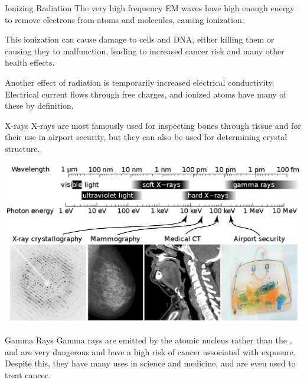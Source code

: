 \documentclass{beamer}
\begin{document}
\begin{frame}{Ionizing Radiation}
    The very high frequency EM waves have high enough energy to remove electrons from atoms and molecules, causing ionization. \newline
    
    This ionization can cause damage to cells and DNA, either killing them or causing they to malfunction, leading to increased cancer risk and many other health effects. \newline
    
    Another effect of radiation is temporarily increased electrical conductivity. Electrical current flows through free charges, and ionized atoms have many of these by definition.
\end{frame}

\begin{frame}{X-rays}
X-rays are most famously used for inspecting bones through tissue and for their use in airport security, but they can also be used for determining crystal structure. 

\includegraphics[scale=.25]{xrayuses.png}
\end{frame}

\begin{frame}{Gamma Rays}
    Gamma rays are emitted by the atomic nucleus rather than the , and are very dangerous and have a high risk of cancer associated with exposure. Despite this, they have many uses in science and medicine, and are even used to treat cancer.
\end{frame}
\end{document}

